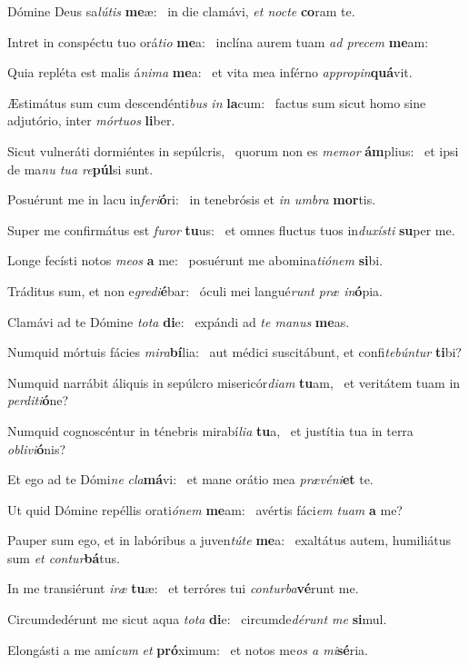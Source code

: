\item Dómine Deus sa\textit{lútis} \textbf{me}æ:~\psstar{} in die clamávi, \textit{et nocte} \textbf{co}ram te.
\item Intret in conspéctu tuo orá\textit{tio} \textbf{me}a:~\psstar{} inclína aurem tuam \textit{ad precem} \textbf{me}am:
\item Quia repléta est malis á\textit{nima} \textbf{me}a:~\psstar{} et vita mea inférno \textit{appropin}\textbf{quá}vit.
\item Æstimátus sum cum descendénti\textit{bus} \textit{in} \textbf{la}cum:~\psstar{} factus sum sicut homo sine adjutório, inter \textit{mórtuos} \textbf{li}ber.
\item Sicut vulneráti dormiéntes in sepúlcris,~\pscross{} quorum non es \textit{memor} \textbf{ám}plius:~\psstar{} et ipsi de ma\textit{nu tua re}\textbf{púl}si sunt.
\item Posuérunt me in lacu in\textit{feri}\textbf{ó}ri:~\psstar{} in tenebrósis et \textit{in umbra} \textbf{mor}tis.
\item Super me confirmátus est \textit{furor} \textbf{tu}us:~\psstar{} et omnes fluctus tuos in\textit{duxísti} \textbf{su}per me.
\item Longe fecísti notos \textit{meos} \textbf{a} me:~\psstar{} posuérunt me abomina\textit{tiónem} \textbf{si}bi.
\item Tráditus sum, et non e\textit{gredi}\textbf{é}bar:~\psstar{} óculi mei langué\textit{runt præ in}\textbf{ó}pia.
\item Clamávi ad te Dómine \textit{tota} \textbf{di}e:~\psstar{} expándi ad \textit{te manus} \textbf{me}as.
\item Numquid mórtuis fácies \textit{mira}\textbf{bí}lia:~\psstar{} aut médici suscitábunt, et confi\textit{tebúntur} \textbf{ti}bi?
\item Numquid narrábit áliquis in sepúlcro misericór\textit{diam} \textbf{tu}am,~\psstar{} et veritátem tuam in \textit{perditi}\textbf{ó}ne?
\item Numquid cognoscéntur in ténebris mirabí\textit{lia} \textbf{tu}a,~\psstar{} et justítia tua in terra \textit{oblivi}\textbf{ó}nis?
\item Et ego ad te Dómi\textit{ne} \textit{cla}\textbf{má}vi:~\psstar{} et mane orátio mea \textit{prævéni}\textbf{et} te.
\item Ut quid Dómine repéllis orati\textit{ónem} \textbf{me}am:~\psstar{} avértis fáci\textit{em tuam} \textbf{a} me?
\item Pauper sum ego, et in labóribus a juven\textit{túte} \textbf{me}a:~\psstar{} exaltátus autem, humiliátus sum \textit{et contur}\textbf{bá}tus.
\item In me transiérunt \textit{iræ} \textbf{tu}æ:~\psstar{} et terróres tui \textit{conturba}\textbf{vé}runt me.
\item Circumdedérunt me sicut aqua \textit{tota} \textbf{di}e:~\psstar{} circumde\textit{dérunt me} \textbf{si}mul.
\item Elongásti a me amí\textit{cum} \textit{et} \textbf{pró}ximum:~\psstar{} et notos me\textit{os a mi}\textbf{sé}ria.
